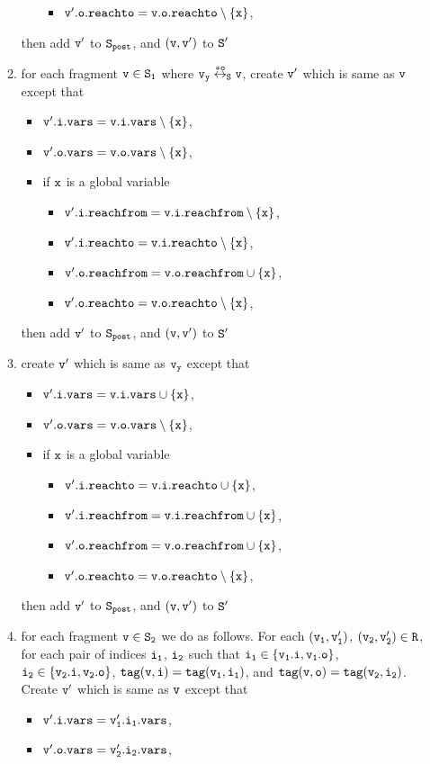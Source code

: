\begin{itemize}
\begin{enumerate}
\begin{itemize}
\begin{itemize}
\item $\tt v'.o.reachto = v.o.reachto \setminus \{x\}$,
\end{itemize}
\end{itemize}
then add $\tt v'$ to $\tt S_{post}$, and $\tt (v,v')$ to $\tt S'$
\item for each fragment $\tt v \in S_1$ where $\tt v_y \overset{*o}\leftrightarrow_S v$, create $\tt v'$ which is same as $\tt v$ except that
\begin{itemize}
\item $\tt v'.i.vars = v.i.vars \setminus \{x\}$,
\item $\tt v'.o.vars = v.o.vars \setminus \{x\}$,
\item if $\tt x$ is a global variable
\begin{itemize}
\item $\tt v'.i.reachfrom = v.i.reachfrom \setminus \{x\}$,
\item $\tt v'.i.reachto = v.i.reachto \setminus \{x\}$,
\item $\tt v'.o.reachfrom = v.o.reachfrom \cup \{x\}$,
\item $\tt v'.o.reachto = v.o.reachto \setminus \{x\}$,
\end{itemize}
\end{itemize}
then add $\tt v'$ to $\tt S_{post}$, and $\tt (v,v')$ to $\tt S'$
\item create $\tt v'$ which is same as $\tt v_y$ except that
\begin{itemize}
\item $\tt v'.i.vars = v.i.vars \cup \{x\}$,
\item $\tt v'.o.vars = v.o.vars \setminus \{x\}$,
\item if $\tt x$ is a global variable
\begin{itemize}
\item $\tt v'.i.reachto = v.i.reachto \cup \{x\}$,
 \item $\tt v'.i.reachfrom = v.i.reachfrom \cup \{x\}$,
\item $\tt v'.o.reachfrom = v.o.reachfrom \cup \{x\}$,
\item $\tt v'.o.reachto = v.o.reachto \setminus \{x\}$,
\end{itemize}
\end{itemize}
then add $\tt v'$ to $\tt S_{post}$, and $\tt (v,v')$ to $\tt S'$
\item for each fragment $\tt v \in S_2$ we do as follows. For each $\tt (v_1,v_1')$, $\tt (v_2,v_2') \in R$, for each pair of indices $\tt i_1$, $\tt i_2$ such that $\tt i_1 \in \{v_1.i, v_1.o\}$, $\tt i_2 \in \{v_2.i, v_2.o\}$, $\tt tag(v,i) = tag(v_1, i_1)$, and $\tt tag(v,o) = tag(v_2, i_2)$. Create $\tt v'$ which is same as $\tt v$ except that 
\begin{itemize}
\item $\tt v'.i.vars = v_1'.i_1.vars$,
\item $\tt v'.o.vars = v_2'.i_2.vars$,


\end{itemize}
\end{enumerate}
\end{itemize}
